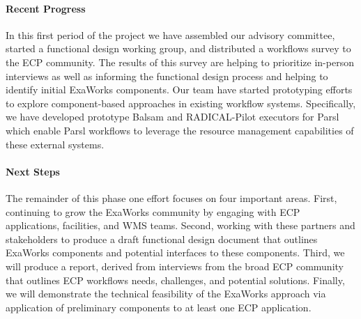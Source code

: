 \paragraph{Recent Progress}
In this first period of the project we have
assembled our advisory committee, 
started a functional design working group, and distributed a workflows
survey to the ECP community. The results of this survey are helping
to prioritize in-person interviews as well as informing the 
functional design process and helping to identify initial ExaWorks components. 
Our team have started prototyping efforts to explore 
component-based approaches in existing workflow systems. Specifically, 
we have developed prototype Balsam and RADICAL-Pilot executors for Parsl
which enable Parsl workflows to leverage the resource management 
capabilities of these external systems.


\paragraph{Next Steps}
The remainder of this phase one effort focuses on four important areas. 
First, continuing to grow the ExaWorks community by engaging with ECP 
applications, facilities, and WMS teams. 
Second, working with these partners and stakeholders to produce a draft
functional design document that outlines ExaWorks components
and potential interfaces to these components. 
Third, we will produce a report, derived from interviews from 
the broad ECP community that outlines ECP workflows needs, challenges, 
and potential solutions. 
Finally, we will demonstrate the technical feasibility of the 
ExaWorks approach via application of preliminary components to
at least one ECP application. 
